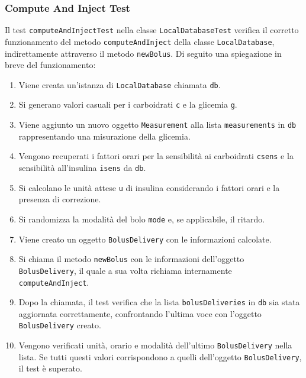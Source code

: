 \documentclass[twocolumn]{article}
\begin{document}
\subsubsection{Compute And Inject Test}
Il test \texttt{computeAndInjectTest} nella classe \texttt{LocalDatabaseTest} verifica il corretto funzionamento del metodo \texttt{computeAndInject} della classe \texttt{LocalDatabase}, indirettamente attraverso il metodo \texttt{newBolus}. Di seguito una spiegazione in breve del funzionamento:
\begin{enumerate}
    \item Viene creata un'istanza di \texttt{LocalDatabase} chiamata \texttt{db}.
    \item Si generano valori casuali per i carboidrati \texttt{c} e la glicemia \texttt{g}.
    \item Viene aggiunto un nuovo oggetto \texttt{Measurement} alla lista \texttt{measurements} in \texttt{db} rappresentando una misurazione della glicemia.
    \item Vengono recuperati i fattori orari per la sensibilità ai carboidrati \texttt{csens} e la sensibilità all'insulina \texttt{isens} da \texttt{db}.
    \item Si calcolano le unità attese \texttt{u} di insulina considerando i fattori orari e la presenza di correzione.
    \item Si randomizza la modalità del bolo \texttt{mode} e, se applicabile, il ritardo.
    \item Viene creato un oggetto \texttt{BolusDelivery} con le informazioni calcolate.
    \item Si chiama il metodo \texttt{newBolus} con le informazioni dell'oggetto \texttt{BolusDelivery}, il quale a sua volta richiama internamente \texttt{computeAndInject}.
    \item Dopo la chiamata, il test verifica che la lista \texttt{bolusDeliveries} in \texttt{db} sia stata aggiornata correttamente, confrontando l'ultima voce con l'oggetto \texttt{BolusDelivery} creato.
    \item Vengono verificati unità, orario e modalità dell'ultimo \texttt{BolusDelivery} nella lista. Se tutti questi valori corrispondono a quelli dell'oggetto \texttt{BolusDelivery}, il test è superato.
\end{enumerate}
\end{document}
